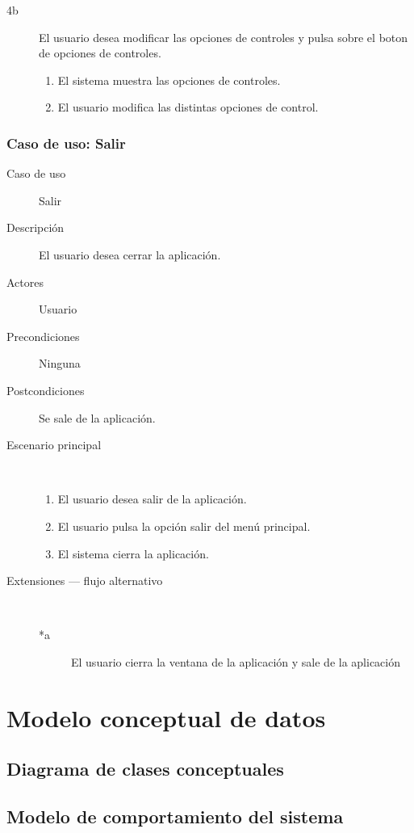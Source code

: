 \begin{description}
\begin{description}
            \item [4b ] El usuario desea modificar las opciones de controles y pulsa sobre el boton de opciones de controles.
                \begin{enumerate}
                    \item El sistema muestra las opciones de controles.
                    \item El usuario modifica las distintas opciones de control.
                \end{enumerate}
            
        \end{description}
\end{description}

\subsubsection{Caso de uso: Salir}

\begin{description}
    \item[Caso de uso] Salir
    \item[Descripción] El usuario desea cerrar la aplicación.
    \item[Actores] Usuario
    \item[Precondiciones] Ninguna
    \item[Postcondiciones] Se sale de la aplicación.
    \item[Escenario principal] $\quad$
        \begin{enumerate}
            \item El usuario desea salir de la aplicación.
            \item El usuario pulsa la opción salir del menú principal.
            \item El sistema cierra la aplicación.
        \end{enumerate}
    \item[Extensiones --- flujo alternativo] $\quad$
        \begin{description}
            \item[*a ] El usuario cierra la ventana de la aplicación y sale de la aplicación
        \end{description}
\end{description}

\section{Modelo conceptual de datos}

\subsection{Diagrama de clases conceptuales}

\subsection{Modelo de comportamiento del sistema}
